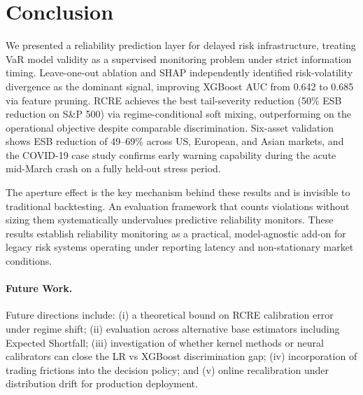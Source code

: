 \documentclass[sigconf, anonymous]{acmart}
\begin{document}
\section{Conclusion}

We presented a reliability prediction layer for delayed risk
infrastructure, treating VaR model validity as a supervised monitoring
problem under strict information timing. Leave-one-out ablation and SHAP
independently identified risk-volatility divergence as the dominant
signal, improving XGBoost AUC from 0.642 to 0.685 via feature pruning. RCRE achieves the best tail-severity reduction (50\% ESB reduction on S\&P 500) via regime-conditional soft mixing, outperforming on the operational objective despite comparable discrimination. Six-asset validation shows ESB reduction of 49--69\% across US, European, and Asian markets, and the COVID-19 case study confirms early warning capability during the acute mid-March crash on a fully held-out stress period.

The aperture effect is the key mechanism behind these results and is invisible to traditional backtesting. An evaluation framework that counts violations without sizing them systematically undervalues predictive reliability monitors. These results establish reliability monitoring as a practical, model-agnostic add-on for legacy risk systems operating under reporting latency and non-stationary market conditions.

\paragraph{Future Work.} Future directions include: (i) a theoretical bound on RCRE calibration error under regime shift; (ii) evaluation across alternative base estimators including Expected Shortfall; (iii) investigation of whether kernel methods or neural calibrators can close the LR vs XGBoost discrimination gap; (iv) incorporation of trading frictions into the decision policy; and (v) online recalibration under distribution drift for production deployment.
\end{document}
